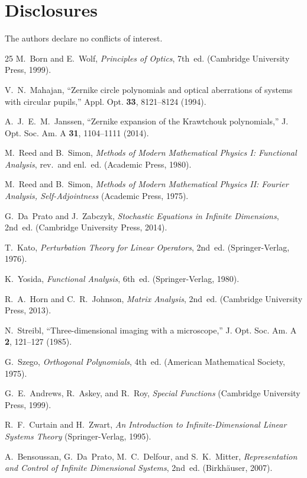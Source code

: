 \documentclass[a4paper,12pt]{article}
\begin{document}
\section*{Disclosures}
The authors declare no conflicts of interest.


\begin{thebibliography}{25}
 M.~Born and E.~Wolf, \emph{Principles of Optics}, 7th~ed. (Cambridge University Press, 1999).

 V.~N.~Mahajan, ``Zernike circle polynomials and optical aberrations of systems with circular pupils,'' Appl. Opt. \textbf{33}, 8121--8124 (1994).

 A.~J.~E.~M.~Janssen, ``Zernike expansion of the Krawtchouk polynomials,'' J. Opt. Soc. Am. A \textbf{31}, 1104--1111 (2014).

 M.~Reed and B.~Simon, \emph{Methods of Modern Mathematical Physics I: Functional Analysis}, rev.~and enl.~ed. (Academic Press, 1980).

 M.~Reed and B.~Simon, \emph{Methods of Modern Mathematical Physics II: Fourier Analysis, Self-Adjointness} (Academic Press, 1975).

 G.~Da~Prato and J.~Zabczyk, \emph{Stochastic Equations in Infinite Dimensions}, 2nd~ed. (Cambridge University Press, 2014).

 T.~Kato, \emph{Perturbation Theory for Linear Operators}, 2nd~ed. (Springer-Verlag, 1976).

 K.~Yosida, \emph{Functional Analysis}, 6th~ed. (Springer-Verlag, 1980).

 R.~A.~Horn and C.~R.~Johnson, \emph{Matrix Analysis}, 2nd~ed. (Cambridge University Press, 2013).

 N.~Streibl, ``Three-dimensional imaging with a microscope,'' J. Opt. Soc. Am. A \textbf{2}, 121--127 (1985).

 G.~Szego, \emph{Orthogonal Polynomials}, 4th~ed. (American Mathematical Society, 1975).

 G.~E.~Andrews, R.~Askey, and R.~Roy, \emph{Special Functions} (Cambridge University Press, 1999).

 R.~F.~Curtain and H.~Zwart, \emph{An Introduction to Infinite-Dimensional Linear Systems Theory} (Springer-Verlag, 1995).

 A.~Bensoussan, G.~Da~Prato, M.~C.~Delfour, and S.~K.~Mitter, \emph{Representation and Control of Infinite Dimensional Systems}, 2nd~ed. (Birkh\"{a}user, 2007).


\end{thebibliography}
\end{document}
